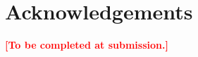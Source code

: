 \documentclass[final,3p,times,twocolumn,number,sort, compress]{elsarticle}
\newcommand{\tbd}[1]{\textcolor{red}{\textbf{[#1]}}}
\begin{document}
\section*{Acknowledgements}
\tbd{To be completed at submission.}


\makeatletter
\let\@oldthebibliography\thebibliography
\renewcommand{\thebibliography}[1]{%
  \@oldthebibliography{#1}%
  \footnotesize\linespread{0.97}\selectfont\setlength{\itemsep}{0pt}\setlength{\parsep}{0pt}\setlength{\parskip}{0pt}\setlength{\topsep}{0pt}\setlength{\partopsep}{0pt}}
\makeatother


\end{document}
